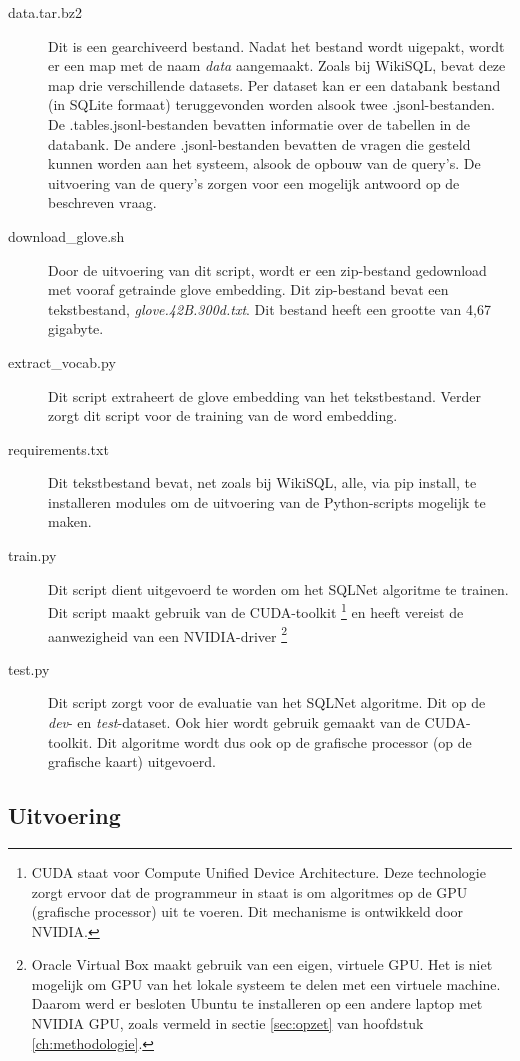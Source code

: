 \begin{description}
	\item[data.tar.bz2] Dit is een gearchiveerd bestand. Nadat het bestand wordt uigepakt, wordt er een map met de naam \textit{data} aangemaakt. Zoals bij WikiSQL, bevat deze map drie verschillende datasets. Per dataset kan er een databank bestand (in SQLite formaat) teruggevonden worden alsook twee .jsonl-bestanden. De .tables.jsonl-bestanden bevatten informatie over de tabellen in de databank. De andere .jsonl-bestanden bevatten de vragen die gesteld kunnen worden aan het systeem, alsook de opbouw van de query's. De uitvoering van de query's zorgen voor een mogelijk antwoord op de beschreven vraag.
	\item[download\_glove.sh] Door de uitvoering van dit script, wordt er een zip-bestand gedownload met vooraf getrainde glove embedding. Dit zip-bestand bevat een tekstbestand, \textit{glove.42B.300d.txt}. Dit bestand heeft een grootte van 4,67 gigabyte.
	\item[extract\_vocab.py] Dit script extraheert de glove embedding van het tekstbestand. Verder zorgt dit script voor de training van de word embedding. 
	\item[requirements.txt] Dit tekstbestand bevat, net zoals bij WikiSQL, alle, via pip install, te installeren modules om de uitvoering van de Python-scripts mogelijk te maken.
	\item[train.py] Dit script dient uitgevoerd te worden om het SQLNet algoritme te trainen. Dit script maakt gebruik van de CUDA-toolkit \footnote{CUDA staat voor Compute Unified Device Architecture. Deze technologie zorgt ervoor dat de programmeur in staat is om algoritmes op de GPU (grafische processor) uit te voeren. Dit mechanisme is ontwikkeld door NVIDIA.} en heeft vereist de aanwezigheid van een NVIDIA-driver \footnote{Oracle Virtual Box maakt gebruik van een eigen, virtuele GPU. Het is niet mogelijk om GPU van het lokale systeem te delen met een virtuele machine. Daarom werd er besloten Ubuntu te installeren op een andere laptop met NVIDIA GPU, zoals vermeld in sectie \ref{sec:opzet} van hoofdstuk \ref{ch:methodologie}.}
	\item[test.py] Dit script zorgt voor de evaluatie van het SQLNet algoritme. Dit op de \textit{dev}- en \textit{test}-dataset. Ook hier wordt gebruik gemaakt van de CUDA-toolkit. Dit algoritme wordt dus ook op de grafische processor (op de grafische kaart) uitgevoerd.
\end{description}

\subsection{Uitvoering}
\label{sec:uitvsqln}

